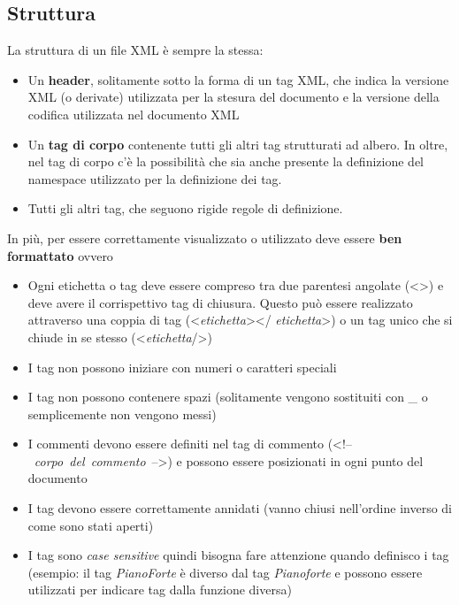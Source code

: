 \documentclass[a4paper,12pt]{report}
\begin{document}
\subsection{Struttura}
La struttura di un file XML è sempre la stessa:
\begin{itemize}
\item Un \textbf{header}, solitamente sotto la forma di un tag XML,  che indica la versione XML (o derivate) utilizzata per la stesura del documento e la versione della codifica utilizzata nel documento XML
\item Un \textbf{tag di corpo} contenente tutti gli altri tag strutturati ad albero. In oltre, nel tag di corpo c'è la possibilità che sia anche presente la definizione del namespace utilizzato per la definizione dei tag.
\item Tutti gli altri tag, che seguono rigide regole di definizione.
\end{itemize}
In più, per essere correttamente visualizzato o utilizzato deve essere \textbf{ben formattato} ovvero
\begin{itemize}
\item Ogni etichetta o tag deve essere compreso tra due parentesi angolate (<>) e deve avere il corrispettivo tag di chiusura. Questo può essere realizzato attraverso una coppia di tag (<\textit{etichetta}></ \textit{etichetta}>) o un tag unico che si chiude in se stesso (<\textit{etichetta}/>)
\item I tag non possono iniziare con numeri o caratteri speciali
\item I tag non possono contenere spazi (solitamente vengono sostituiti con \_ o semplicemente non vengono messi)
\item I commenti devono essere definiti nel tag di commento (<!--~\textit{corpo~del~commento}~-->) e possono essere posizionati in ogni punto del documento
\item I tag devono essere correttamente annidati (vanno chiusi nell'ordine inverso di come sono stati aperti)
\item I tag sono \textit{case sensitive} quindi bisogna fare attenzione quando definisco i tag (esempio: il tag \textit{PianoForte} è diverso dal tag \textit{Pianoforte} e possono essere utilizzati per indicare tag dalla funzione diversa)
\end{itemize}
\end{document}
